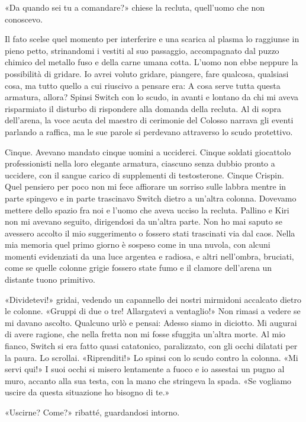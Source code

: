 «Da quando sei tu a comandare?» chiese la recluta, quell'uomo che non
conoscevo.

Il fato scelse quel momento per interferire e una scarica al plasma lo
raggiunse in pieno petto, strinandomi i vestiti al suo passaggio,
accompagnato dal puzzo chimico del metallo fuso e della carne umana
cotta. L'uomo non ebbe neppure la possibilità di gridare. Io avrei
voluto gridare, piangere, fare qualcosa, qualsiasi cosa, ma tutto quello
a cui riuscivo a pensare era: A cosa serve tutta questa armatura,
allora? Spinsi Switch con lo scudo, in avanti e lontano da chi mi aveva
risparmiato il disturbo di rispondere alla domanda della recluta. Al di
sopra dell'arena, la voce acuta del maestro di cerimonie del Colosso
narrava gli eventi parlando a raffica, ma le sue parole si perdevano
attraverso lo scudo protettivo.

Cinque. Avevano mandato cinque uomini a ucciderci. Cinque soldati
giocattolo professionisti nella loro elegante armatura, {ciascuno} senza
dubbio pronto a uccidere, con il sangue carico di supplementi di
testosterone. Cinque Crispin. Quel pensiero per poco non mi fece
affiorare un sorriso sulle labbra mentre in parte spingevo e in parte
trascinavo Switch dietro a un'altra colonna. Dovevamo mettere dello
spazio fra noi e l'uomo che aveva ucciso la recluta. Pallino e Kiri non
mi avevano seguito, dirigendosi da un'altra parte. Non ho mai saputo se
avessero accolto il mio suggerimento o fossero stati trascinati via dal
caos. Nella mia memoria quel primo giorno è sospeso come in una nuvola,
con alcuni momenti evidenziati da una luce argentea e radiosa, e altri
nell'ombra, bruciati, come se quelle colonne grigie fossero state fumo e
il clamore dell'arena un distante tuono primitivo.

«Dividetevi!» gridai, vedendo un capannello dei nostri mirmidoni
accalcato dietro le colonne. «Gruppi di due o tre! Allargatevi a
ventaglio!» Non rimasi a vedere se mi davano ascolto. Qualcuno urlò e
pensai: Adesso siamo in diciotto. Mi augurai di avere ragione, che nella
fretta non mi fosse sfuggita un'altra morte. Al mio fianco, Switch si
era fatto quasi catatonico, paralizzato, con gli occhi dilatati per la
paura. Lo scrollai. «Riprenditi!» Lo spinsi con lo scudo contro la
colonna. «Mi servi qui!» I suoi occhi si misero lentamente a fuoco e io
assestai un pugno al muro, accanto alla sua testa, con la mano che
stringeva la spada. «Se vogliamo uscire da questa situazione ho bisogno
di te.»

«Uscirne? Come?» ribatté, guardandosi intorno.


